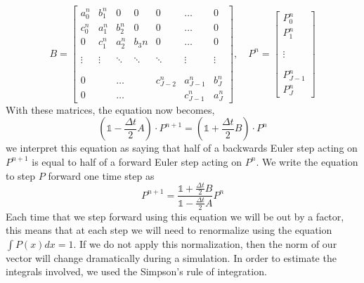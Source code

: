 \begin{equation}
B =
\begin{bmatrix}
	a_0^{n} & b_1^{n}     & 0                 & 0          & 0                    & \dots            & 0        \\
	c_0^{n} & a_1^{n}     & b_2^{n}      & 0          & 0                    & \dots            & 0        \\
	0                & c_1^{n} & a_2^{n}      & b_3{n} & 0                    & \dots            & 0        \\
			     &               &                   &             &                      &                     &           \\
	\vdots         & \vdots     & \ddots         & \ddots   & \ddots            & \vdots           & \vdots \\
			     &               &                   &             &                      &                     &           \\
			     &               &                   &             &                      &                     &           \\
	0                &               & \dots           &             &  c_{J-2}^{n} & a_{J-1}^{n}  & b_J^{n} \\
	0                &               & \dots           &             &                     &  c_{J-1}^{n} & a_J^{n}
\end{bmatrix}
,\quad P^{n} =
\begin{bmatrix}
P_0^{n}       \\
P_1^n          \\
                    \\
                    \\
\vdots           \\
                    \\
                    \\
P_{J-1}^{n} \\
P_J^{n}
\end{bmatrix}
\end{equation}
With these matrices, the equation now becomes,
\begin{equation}
\left (\mathbb{1} - \frac{\Delta t}{2}A \right) \cdot P^{n+1} = \left (\mathbb{1} + \frac{\Delta t}{2}B \right) \cdot P^n
\end{equation}
we interpret this equation as saying that half of a backwards Euler step acting on $P^{n+1}$ is equal to half of a forward Euler step acting on $P^n$. We write the equation to step $P$ forward one time step as
\begin{equation}
P^{n+1} = \frac{\mathbb{1} + \frac{\Delta t}{2}B}{\mathbb{1} - \frac{\Delta t}{2}A} P^n
\end{equation}
Each time that we step forward using this equation we will be out by a factor, this means that at each step we will need to renormalize using the equation $\int P(x) dx = 1$. If we do not apply this normalization, then the norm of our vector will change dramatically during a simulation. In order to estimate the integrals involved, we used the Simpson's rule of integration.

